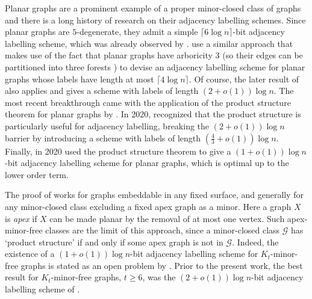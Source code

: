 \documentclass{patmorin}
\renewcommand{\geq}{\geqslant}
\newcommand{\vida}[1]{{\color{pink} VD: #1}}
\newcommand{\defin}[1]{\emph{\textcolor{brightmaroon}{#1}}}
\newcommand{\calG}{\mathcal{G}}
\begin{document}
Planar graphs are a prominent example of a proper minor-closed class of graphs and there is a long history of research
on their adjacency labelling schemes.
Since planar graphs are $5$-degenerate,
they admit a simple $\lceil6\log n\rceil$-bit adjacency labelling scheme, which was already observed by \citet{muller:local}.
\citet{kannan.naor.ea:implicit} use a similar approach that makes use of the fact that planar graphs have arboricity 3 (so their edges can be partitioned into three forests \cite{nash-williams:edge-disjoint}) to devise an adjacency labelling scheme for planar graphs whose labels have length at most $\lceil4\log n\rceil$.
Of course, the later result of \citet{gavoille.labourel:shorter} also applies and gives a scheme with labels of length $(2+o(1))\log n$.
The most recent breakthrough came with the application of the product structure theorem for planar graphs by \citet{dujmovic.joret.ea:planar}. 
In 2020, \citet{BGP22} recognized that the product structure is particularly useful for adjacency labelling, breaking the $(2+o(1))\log n$  barrier by introducing a scheme with labels of length $(\frac{4}{3}+o(1))\log n$.
Finally, in 2020 \citet{dujmovic.esperet.ea:adjacency} used the product structure theorem to give a $(1+o(1))\log n$-bit adjacency labelling scheme for planar graphs, which is optimal up to the lower order term.

The proof of \citet{dujmovic.esperet.ea:adjacency} works for  graphs embeddable in any fixed surface, and generally for any minor-closed class excluding a fixed apex graph as a minor. Here a graph $X$ is \defin{apex} if $X$ can be made planar by the removal of at most one vertex. 
Such apex-minor-free classes are the limit of this approach, since a minor-closed class $\calG$ has `product structure' if and only if some apex graph is not in $\calG$. Indeed, the existence of a $(1+o(1))\log n$-bit adjacency labelling scheme for $K_t$-minor-free graphs is stated as an open problem by \citet[Section~6, Problem~2]{dujmovic.esperet.ea:adjacency}. Prior to the present work, the best result for $K_t$-minor-free graphs, $t\geq 6$, was the $(2+o(1))\log n$-bit adjacency labelling scheme of \citet{gavoille.labourel:shorter}.



\end{document}

